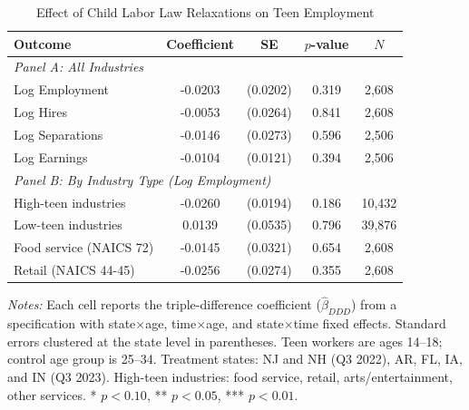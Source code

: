 \begin{table}[htbp]
\centering
\caption{Effect of Child Labor Law Relaxations on Teen Employment}
\label{tab:main}
\begin{threeparttable}
\begin{tabular}{lcccc}
\toprule
Outcome & Coefficient & SE & $p$-value & $N$ \\
\midrule
\multicolumn{5}{l}{\textit{Panel A: All Industries}} \\
Log Employment & -0.0203 & (0.0202) & 0.319 & 2,608 \\
Log Hires & -0.0053 & (0.0264) & 0.841 & 2,608 \\
Log Separations & -0.0146 & (0.0273) & 0.596 & 2,506 \\
Log Earnings & -0.0104 & (0.0121) & 0.394 & 2,506 \\
\midrule
\multicolumn{5}{l}{\textit{Panel B: By Industry Type (Log Employment)}} \\
High-teen industries & -0.0260 & (0.0194) & 0.186 & 10,432 \\
Low-teen industries & 0.0139 & (0.0535) & 0.796 & 39,876 \\
Food service (NAICS 72) & -0.0145 & (0.0321) & 0.654 & 2,608 \\
Retail (NAICS 44-45) & -0.0256 & (0.0274) & 0.355 & 2,608 \\
\bottomrule
\end{tabular}
\begin{tablenotes}[flushleft]
\small
\item \textit{Notes:} Each cell reports the triple-difference coefficient ($\hat{\beta}_{DDD}$) from a specification with state$\times$age, time$\times$age, and state$\times$time fixed effects. Standard errors clustered at the state level in parentheses. Teen workers are ages 14--18; control age group is 25--34. Treatment states: NJ and NH (Q3 2022), AR, FL, IA, and IN (Q3 2023). High-teen industries: food service, retail, arts/entertainment, other services. * $p<0.10$, ** $p<0.05$, *** $p<0.01$.
\end{tablenotes}
\end{threeparttable}
\end{table}
